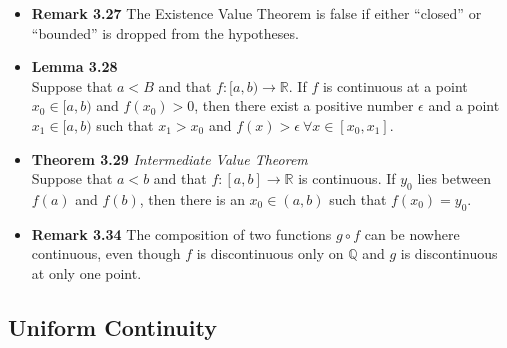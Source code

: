 \documentclass[11pt,a4paper]{article}
\begin{document}
\begin{itemize}
\[        \]
        then there exist points $x_m, x_M \in I$ such that
        \[
            f(x_M) = M \quad \text{and} \quad f(x_m) = m
        \]
    \item \textbf{Remark 3.27}
        The Existence Value Theorem is false if either ``closed'' or ``bounded'' is dropped
        from the hypotheses.
    \item \textbf{Lemma 3.28} \\
        Suppose that $a < B$ and that $f : [a, b) \to \mathbb{R}$.
        If $f$ is continuous at a point $x_0 \in [a,b)$ and $f(x_0) > 0$,
        then there exist a positive number $\epsilon$ and a point
        $x_1 \in [a, b)$ such that $x_1 > x_0$ and $f(x) > \epsilon \ \forall
        x \in [x_0, x_1]$.
    \item \textbf{Theorem 3.29} \emph{Intermediate Value Theorem} \\
        Suppose that $a < b$ and that $f : [a, b] \to \mathbb{R}$ is continuous.
        If $y_0$ lies between $f(a)$ and $f(b)$, then there is an $x_0 \in (a, b)$
        such that $f(x_0) = y_0$.
    \item \textbf{Remark 3.34}
        The composition of two functions $g \circ f$ can be nowhere continuous,
        even though $f$ is discontinuous only on $\mathbb{Q}$ and $g$ is discontinuous
        at only one point.
\end{itemize}

\subsection{Uniform Continuity}
\end{document}
